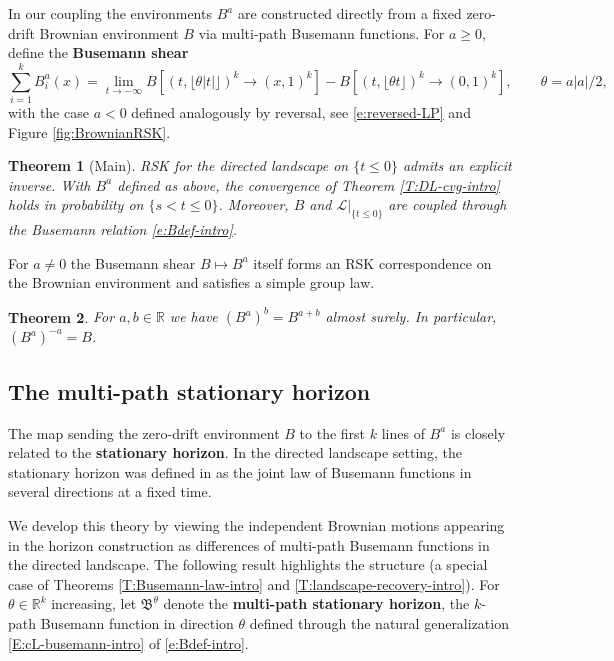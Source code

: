 \documentclass[11pt]{article}
\newtheorem{theorem}{Theorem}[section]
\theoremstyle{definition} %
\theoremstyle{remark} %
\begin{document}
In our coupling the environments \(B^a\) are constructed directly from a fixed zero-drift Brownian environment \(B\) via multi-path Busemann functions. For \(a\ge 0\), define the {\bf Busemann shear}
\[
\sum_{i=1}^k B^a_i(x)=\lim_{t\to-\infty}B[(t,\lfloor\theta |t|\rfloor)^k\to(x,1)^k]-B[(t,\lfloor\theta t\rfloor)^k\to(0,1)^k],\qquad\theta=a|a|/2,
\]
with the case \(a<0\) defined analogously by reversal, see  \eqref{e:reversed-LP} and Figure \ref{fig:BrownianRSK}.

\begin{theorem}[Main]
\label{T:RSK-intro}\label{t:main-intro}
RSK for the directed landscape on \(\{t\le 0\}\) admits an explicit inverse. With \(B^a\) defined as above, the convergence of Theorem \ref{T:DL-cvg-intro} holds in probability on \(\{s<t\le 0\}\). Moreover, \(B\) and \(\mathcal{L}|_{\{t\le 0\}}\) are coupled through the Busemann relation \eqref{e:Bdef-intro}.
\end{theorem}

For \(a\neq 0\) the Busemann shear \(B\mapsto B^a\) itself forms an RSK correspondence on the Brownian environment and satisfies a simple group law.

\begin{theorem}
For \(a,b\in\mathbb{R}\) we have \((B^a)^b=B^{a+b}\) almost surely. In particular, \((B^a)^{-a}=B\).
\end{theorem}

\subsection{The multi-path stationary horizon}

The map sending the zero-drift environment \(B\) to the first \(k\) lines of \(B^a\) is closely related to the {\bf  stationary horizon}. In the directed landscape setting, the stationary horizon was defined in \cite{busani2024stationary} as the joint law of Busemann functions in several directions at a fixed time.

We develop this theory by viewing the independent Brownian motions appearing in the horizon construction as differences of multi-path Busemann functions in the directed landscape. The following result highlights the structure (a special case of Theorems \ref{T:Busemann-law-intro} and \ref{T:landscape-recovery-intro}). For $\theta \in \mathbb R^k$ increasing, let $\mathfrak B^\theta$ denote the {\bf multi-path stationary horizon},  the $k$-path Busemann function in direction $\theta$ defined through the natural generalization \eqref{E:cL-busemann-intro} of \eqref{e:Bdef-intro}.
\end{document}
